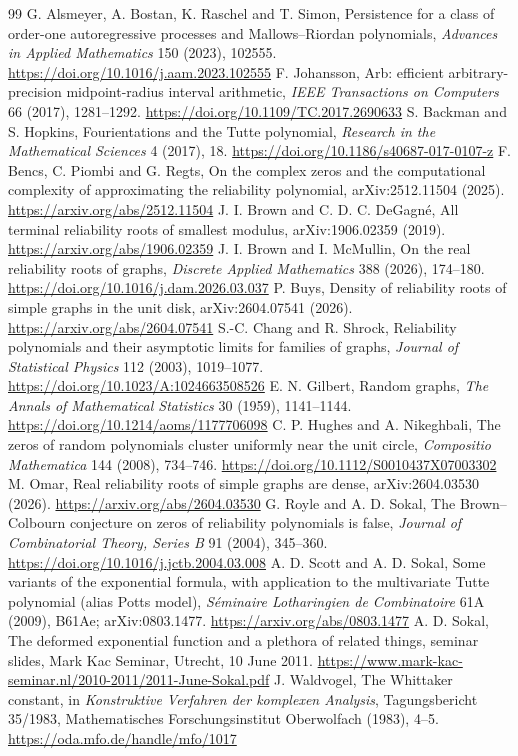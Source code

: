 \documentclass[11pt,a4paper]{article}
\theoremstyle{remark}
\begin{document}
\begin{thebibliography}{99}\small
{} G. Alsmeyer, A. Bostan, K. Raschel and T. Simon, Persistence for a class of order-one autoregressive processes and Mallows--Riordan polynomials, \emph{Advances in Applied Mathematics} 150 (2023), 102555. \url{https://doi.org/10.1016/j.aam.2023.102555}
 F. Johansson, Arb: efficient arbitrary-precision midpoint-radius interval arithmetic, \emph{IEEE Transactions on Computers} 66 (2017), 1281--1292. \url{https://doi.org/10.1109/TC.2017.2690633}
 S. Backman and S. Hopkins, Fourientations and the Tutte polynomial, \emph{Research in the Mathematical Sciences} 4 (2017), 18. \url{https://doi.org/10.1186/s40687-017-0107-z}
 F. Bencs, C. Piombi and G. Regts, On the complex zeros and the computational complexity of approximating the reliability polynomial, arXiv:2512.11504 (2025). \url{https://arxiv.org/abs/2512.11504}
 J. I. Brown and C. D. C. DeGagn\'e, All terminal reliability roots of smallest modulus, arXiv:1906.02359 (2019). \url{https://arxiv.org/abs/1906.02359}
 J. I. Brown and I. McMullin, On the real reliability roots of graphs, \emph{Discrete Applied Mathematics} 388 (2026), 174--180. \url{https://doi.org/10.1016/j.dam.2026.03.037}
 P. Buys, Density of reliability roots of simple graphs in the unit disk, arXiv:2604.07541 (2026). \url{https://arxiv.org/abs/2604.07541}
 S.-C. Chang and R. Shrock, Reliability polynomials and their asymptotic limits for families of graphs, \emph{Journal of Statistical Physics} 112 (2003), 1019--1077. \url{https://doi.org/10.1023/A:1024663508526}
 E. N. Gilbert, Random graphs, \emph{The Annals of Mathematical Statistics} 30 (1959), 1141--1144. \url{https://doi.org/10.1214/aoms/1177706098}
 C. P. Hughes and A. Nikeghbali, The zeros of random polynomials cluster uniformly near the unit circle, \emph{Compositio Mathematica} 144 (2008), 734--746. \url{https://doi.org/10.1112/S0010437X07003302}
 M. Omar, Real reliability roots of simple graphs are dense, arXiv:2604.03530 (2026). \url{https://arxiv.org/abs/2604.03530}
 G. Royle and A. D. Sokal, The Brown--Colbourn conjecture on zeros of reliability polynomials is false, \emph{Journal of Combinatorial Theory, Series B} 91 (2004), 345--360. \url{https://doi.org/10.1016/j.jctb.2004.03.008}
 A. D. Scott and A. D. Sokal, Some variants of the exponential formula, with application to the multivariate Tutte polynomial (alias Potts model), \emph{S\'eminaire Lotharingien de Combinatoire} 61A (2009), B61Ae; arXiv:0803.1477. \url{https://arxiv.org/abs/0803.1477}
 A. D. Sokal, The deformed exponential function and a plethora of related things, seminar slides, Mark Kac Seminar, Utrecht, 10 June 2011. \url{https://www.mark-kac-seminar.nl/2010-2011/2011-June-Sokal.pdf}
 J. Waldvogel, The Whittaker constant, in \emph{Konstruktive Verfahren der komplexen Analysis}, Tagungsbericht 35/1983, Mathematisches Forschungsinstitut Oberwolfach (1983), 4--5. \url{https://oda.mfo.de/handle/mfo/1017}
\end{thebibliography}
\end{document}
